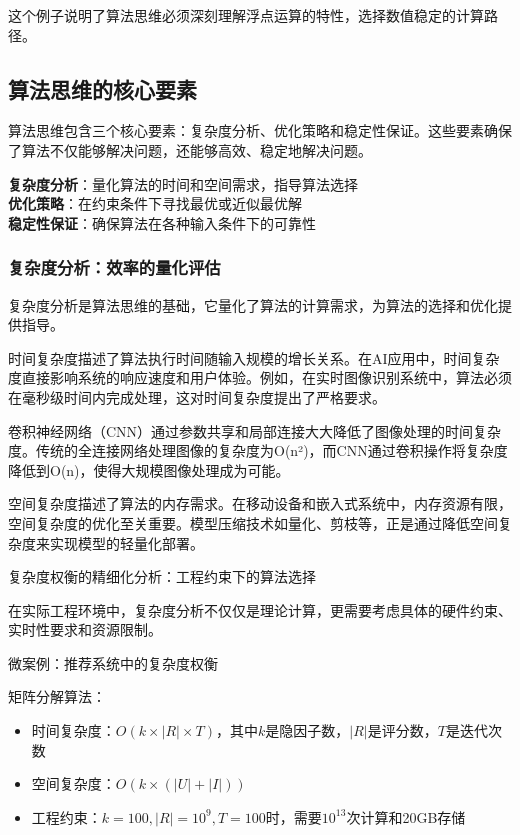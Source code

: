 这个例子说明了算法思维必须深刻理解浮点运算的特性，选择数值稳定的计算路径。

\subsection{算法思维的核心要素}

算法思维包含三个核心要素：复杂度分析、优化策略和稳定性保证。这些要素确保了算法不仅能够解决问题，还能够高效、稳定地解决问题。

\begin{tcolorbox}[colback=orange!5!white,colframe=orange!75!black,title=核心要素：算法思维的三大支柱]
\textbf{复杂度分析}：量化算法的时间和空间需求，指导算法选择\\
\textbf{优化策略}：在约束条件下寻找最优或近似最优解\\
\textbf{稳定性保证}：确保算法在各种输入条件下的可靠性
\end{tcolorbox}

\subsubsection{复杂度分析：效率的量化评估}

复杂度分析是算法思维的基础，它量化了算法的计算需求，为算法的选择和优化提供指导。

时间复杂度描述了算法执行时间随输入规模的增长关系。在AI应用中，时间复杂度直接影响系统的响应速度和用户体验。例如，在实时图像识别系统中，算法必须在毫秒级时间内完成处理，这对时间复杂度提出了严格要求。

卷积神经网络（CNN）通过参数共享和局部连接大大降低了图像处理的时间复杂度。传统的全连接网络处理图像的复杂度为O(n²)，而CNN通过卷积操作将复杂度降低到O(n)，使得大规模图像处理成为可能。

空间复杂度描述了算法的内存需求。在移动设备和嵌入式系统中，内存资源有限，空间复杂度的优化至关重要。模型压缩技术如量化、剪枝等，正是通过降低空间复杂度来实现模型的轻量化部署。

复杂度权衡的精细化分析：工程约束下的算法选择

在实际工程环境中，复杂度分析不仅仅是理论计算，更需要考虑具体的硬件约束、实时性要求和资源限制。

微案例：推荐系统中的复杂度权衡

矩阵分解算法：
\begin{itemize}
\item 时间复杂度：$O(k \times |R| \times T)$，其中$k$是隐因子数，$|R|$是评分数，$T$是迭代次数
\item 空间复杂度：$O(k \times (|U| + |I|))$
\item 工程约束：$k=100, |R|=10^9, T=100$时，需要$10^{13}$次计算和20GB存储
\end{itemize}

